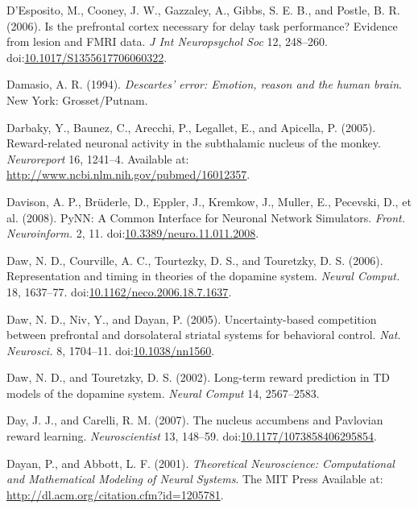 \documentclass[
  11pt,
  a4paper,
]{scrbook}
\newlength{\cslhangindent}
\newenvironment{CSLReferences}[2] %
 {\begin{list}{}{%
  \setlength{\itemindent}{0pt}
  \setlength{\leftmargin}{0pt}
  \setlength{\parsep}{0pt}
  \ifodd #1
   \setlength{\leftmargin}{\cslhangindent}
   \setlength{\itemindent}{-1\cslhangindent}
  \fi
  \setlength{\itemsep}{#2\baselineskip}}}
 {\end{list}}
\begin{document}
\begin{CSLReferences}{1}{1}
D'Esposito, M., Cooney, J. W., Gazzaley, A., Gibbs, S. E. B., and
Postle, B. R. (2006). Is the prefrontal cortex necessary for delay task
performance? {E}vidence from lesion and {FMRI} data. \emph{J Int
Neuropsychol Soc} 12, 248--260.
doi:\href{https://doi.org/10.1017/S1355617706060322}{10.1017/S1355617706060322}.

Damasio, A. R. (1994). \emph{Descartes' error: Emotion, reason and the
human brain}. New York: Grosset/Putnam.

Darbaky, Y., Baunez, C., Arecchi, P., Legallet, E., and Apicella, P.
(2005). {Reward-related neuronal activity in the subthalamic nucleus of
the monkey.} \emph{Neuroreport} 16, 1241--4. Available at:
\url{http://www.ncbi.nlm.nih.gov/pubmed/16012357}.

Davison, A. P., Brüderle, D., Eppler, J., Kremkow, J., Muller, E.,
Pecevski, D., et al. (2008). {PyNN: A Common Interface for Neuronal
Network Simulators.} \emph{Front. Neuroinform.} 2, 11.
doi:\href{https://doi.org/10.3389/neuro.11.011.2008}{10.3389/neuro.11.011.2008}.

Daw, N. D., Courville, A. C., Tourtezky, D. S., and Touretzky, D. S.
(2006). {Representation and timing in theories of the dopamine system.}
\emph{Neural Comput.} 18, 1637--77.
doi:\href{https://doi.org/10.1162/neco.2006.18.7.1637}{10.1162/neco.2006.18.7.1637}.

Daw, N. D., Niv, Y., and Dayan, P. (2005). {Uncertainty-based
competition between prefrontal and dorsolateral striatal systems for
behavioral control.} \emph{Nat. Neurosci.} 8, 1704--11.
doi:\href{https://doi.org/10.1038/nn1560}{10.1038/nn1560}.

Daw, N. D., and Touretzky, D. S. (2002). Long-term reward prediction in
TD models of the dopamine system. \emph{Neural Comput} 14, 2567--2583.

Day, J. J., and Carelli, R. M. (2007). {The nucleus accumbens and
Pavlovian reward learning.} \emph{Neuroscientist} 13, 148--59.
doi:\href{https://doi.org/10.1177/1073858406295854}{10.1177/1073858406295854}.

Dayan, P., and Abbott, L. F. (2001). \emph{{Theoretical Neuroscience:
Computational and Mathematical Modeling of Neural Systems}}. The MIT
Press Available at: \url{http://dl.acm.org/citation.cfm?id=1205781}.


\end{CSLReferences}
\end{document}
